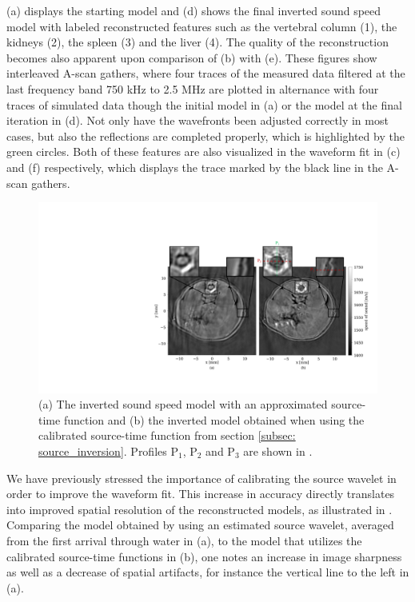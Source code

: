 \documentclass[12pt]{iopart}
\begin{document}
(a) displays the starting model and (d) shows the final inverted sound speed model with labeled reconstructed features such as the vertebral column (1), the kidneys (2), the spleen (3) and the liver (4). The quality of the reconstruction becomes also apparent upon comparison of (b) with (e). These figures show interleaved A-scan gathers, where four traces of the measured data filtered at the last frequency band 750 kHz to 2.5 MHz are plotted in alternance with four traces of simulated data though the initial model in (a) or the model at the final iteration in (d). Not only have the wavefronts been adjusted correctly in most cases, but also the reflections are completed properly, which is highlighted by the green circles. Both of these features are also visualized in the waveform fit in (c) and (f) respectively, which displays the trace marked by the black line in the A-scan gathers.
\begin{figure}[!h]
  \centering
  \includegraphics[width=\textwidth]{figure4.pdf}
  \caption{(a) The inverted sound speed model with an approximated source-time function and (b) the inverted model obtained when using the calibrated source-time function from section \ref{subsec: source_inversion}. Profiles P$_1$, P$_2$ and P$_3$ are shown in .}
  \label{fig:Compare_estimatesSTF_invertedSTF_withProfiles}
\end{figure}

We have previously stressed the importance of calibrating the source wavelet in order to improve the waveform fit. This increase in accuracy directly translates into improved spatial resolution of the reconstructed models, as illustrated in . Comparing the model obtained by using an estimated source wavelet, averaged from the first arrival through water in (a), to the model that utilizes the calibrated source-time functions in (b), one notes an increase in image sharpness as well as a decrease of spatial artifacts, for instance the vertical line to the left in (a).
\end{document}
